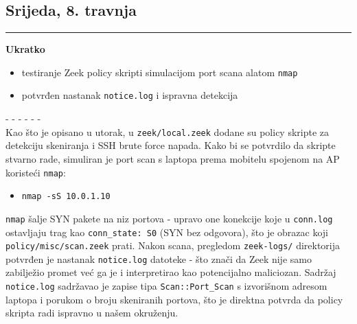 \documentclass[12pt, a4paper]{article}
\newcommand{\dan}[1]{
    \subsection*{#1}
    \vspace{-0.5em} 
    \hrule \vspace{0.5em} 
}
\begin{document}
\dan{Srijeda, 8. travnja}
\textbf{Ukratko}
\begin{itemize}
    \item testiranje Zeek policy skripti simulacijom port scana alatom \lstinline|nmap|
    \item potvrđen nastanak \lstinline|notice.log| i ispravna detekcija
\end{itemize}
- - - - - - \\
Kao što je opisano u utorak, u \lstinline|zeek/local.zeek| dodane su policy skripte za detekciju
skeniranja i SSH brute force napada.
Kako bi se potvrdilo da skripte stvarno rade, simuliran je port scan s laptopa prema mobitelu
spojenom na AP koristeći \lstinline|nmap|:
\begin{itemize}
    \item \lstinline|nmap -sS 10.0.1.10|
\end{itemize}
\lstinline|nmap| šalje SYN pakete na niz portova - upravo one konekcije koje u \lstinline|conn.log|
ostavljaju trag kao \lstinline|conn_state: S0| (SYN bez odgovora), što je obrazac koji
\lstinline|policy/misc/scan.zeek| prati.
Nakon scana, pregledom \lstinline|zeek-logs/| direktorija potvrđen je nastanak
\lstinline|notice.log| datoteke - što znači da Zeek nije samo zabilježio promet već ga je
i interpretirao kao potencijalno maliciozan.
Sadržaj \lstinline|notice.log| sadržavao je zapise tipa \lstinline|Scan::Port_Scan| s
izvorišnom adresom laptopa i porukom o broju skeniranih portova, što je direktna potvrda
da policy skripta radi ispravno u našem okruženju.
 
\end{document}

